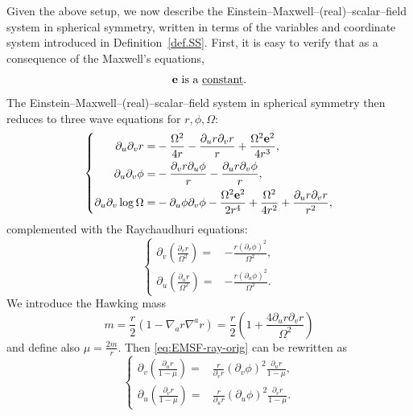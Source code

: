 \documentclass[10pt, reqno]{amsart}
\theoremstyle{definition}
\theoremstyle{remark}
\theoremstyle{conjecture}
\numberwithin{equation}{section}
\newcommand{\rd}{\partial}
\newcommand{\nb}{\nabla}
\newcommand{\0}{\emptyset}
\newcommand{\Omg}{\Omega}
\newcommand{\bfe}{{\bf e}}
\newcommand{\e}{\bfe}							%
\begin{document}
Given the above setup, we now describe the Einstein--Maxwell--(real)--scalar--field system in spherical symmetry, written in terms of the variables and coordinate system introduced in Definition~\ref{def.SS}. First, it is easy to verify that as a consequence of the Maxwell's equations,
\begin{equation}
{\bf e}\mbox{ is a \underline{constant}.}
\end{equation}
The Einstein--Maxwell--(real)--scalar--field system in spherical symmetry then reduces to three wave equations for $r, \phi, \Omg$:
\begin{equation} \label{eq:EMSF-wave}
\left\{
\begin{aligned}
\rd_{u} \rd_{v} r = & - \frac{\Omg^{2}}{4 r} - \frac{\rd_{u} r \rd_{v} r}{r} + \frac{\Omg^{2} \e^{2}}{4 r^{3}}, \\
\rd_{u} \rd_{v} \phi = & - \frac{\rd_{v} r \rd_{u} \phi}{r} - \frac{\rd_{u} r \rd_{v} \phi}{r}, \\
\rd_{u} \rd_{v} \log \Omg = & - \rd_{u} \phi \rd_{v} \phi - \frac{\Omg^{2} \e^{2}}{2 r^{4}} + \frac{\Omg^{2}}{4 r^{2}} + \frac{\rd_{u} r \rd_{v} r}{r^{2}},
\end{aligned}
\right.
\end{equation}
complemented with the Raychaudhuri equations:
\begin{equation} \label{eq:EMSF-ray-orig}
\left\{
\begin{aligned}
	\rd_{v} \left( \frac{\rd_{v} r}{\Omg^{2}}\right) =& - \frac{r (\rd_{v} \phi)^{2}}{\Omg^{2}} ,\\
	\rd_{u} \left( \frac{\rd_{u} r}{\Omg^{2}}\right) =& - \frac{r (\rd_{u} \phi)^{2}}{\Omg^{2}} .
\end{aligned}
\right.
\end{equation}
We introduce the Hawking mass
\begin{equation}\label{eq:mass.def}
	m = \frac{r}{2} (1 - \nb_{a} r \nb^{a} r) = \frac{r}{2} \left( 1 + \frac{4 \rd_{u} r \rd_{v} r}{\Omg^{2}} \right)
\end{equation}
and define also $\mu = \frac{2m}{r}$. Then \eqref{eq:EMSF-ray-orig} can be rewritten as
\begin{equation} \label{eq:EMSF-ray}
\left\{
\begin{aligned} 
	\rd_{v} \left(\frac{\rd_{u} r}{1-\mu} \right) =& \frac{r}{\rd_{v} r} (\rd_{v} \phi)^{2} \frac{\rd_{u} r}{1-\mu}, \\
	\rd_{u} \left(\frac{\rd_{v} r}{1-\mu} \right) =& \frac{r}{\rd_{u} r} (\rd_{u} \phi)^{2} \frac{\rd_{v} r}{1-\mu}.
\end{aligned}
\right.
\end{equation}
\end{document}
